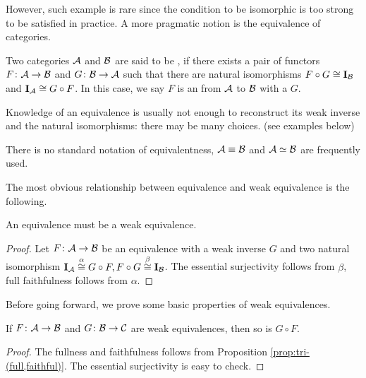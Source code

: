   However, such example is rare since the condition to be isomorphic is too strong to be satisfied in practice.
  A more pragmatic notion is the equivalence of categories.
  \begin{defn}
    Two categories ${\cal A}$ and ${\cal B}$ are said to be , if there exists a pair of functors $F\colon{\cal A}\to{\cal B}$ and $G\colon{\cal B}\to{\cal A}$ such that there are natural isomorphisms $F\circ G\cong \operatorname{\mathbf{I}}_{{\cal B}}$ and $\operatorname{\mathbf{I}}_{{\cal A}}\cong G\circ F$. In this case, we say $F$ is an  from ${\cal A}$ to ${\cal B}$ with a  $G$.
  \end{defn}
  \begin{rem}
    Knowledge of an equivalence is usually not enough to reconstruct its weak inverse and the natural isomorphisms: there may be many choices. (see examples below)
  \end{rem}
  \begin{rem}
    There is no standard notation of equivalentness, ${\cal A}\equiv{\cal B}$ and ${\cal A}\simeq{\cal B}$ are frequently used.
  \end{rem}

  The most obvious relationship between equivalence and weak equivalence is the following.
  \begin{prop}
    An equivalence must be a weak equivalence.
  \end{prop}
  \begin{proof}
    Let $F\colon{\cal A}\to{\cal B}$ be an equivalence with a weak inverse $G$ and two natural isomorphism $\operatorname{\mathbf{I}}_{{\cal A}}\stackrel{\alpha}{\cong} G\circ F, F\circ G \stackrel{\beta}{\cong} \operatorname{\mathbf{I}}_{{\cal B}}$.
    The essential surjectivity follows from $\beta$, full faithfulness follows from $\alpha$.
  \end{proof}

  Before going forward, we prove some basic properties of weak equivalences.
  \begin{prop}
    If $F\colon{\cal A}\to{\cal B}$ and $G\colon{\cal B}\to{\cal C}$ are weak equivalences, then so is $G\circ F$.
  \end{prop}
  \begin{proof}
    The fullness and faithfulness follows from Proposition \ref{prop:tri-(full,faithful)}. The essential surjectivity is easy to check.
  \end{proof}

